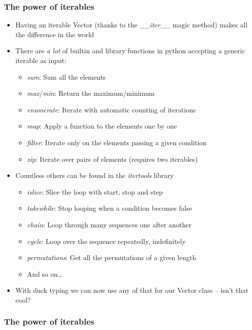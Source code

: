 \documentclass[9pt]{beamer}
\begin{document}
\begin{frame}
  \frametitle{The power of iterables}
  \begin{itemize}
    \item Having an iterable Vector (thanks to the \emph{\_\_iter\_\_} magic
          method) makes all the difference in the world
    \smallskip
    \item There are \emph{a lot} of builtin and library functions in python accepting a
          generic iterable as input:
    \begin{itemize}
      \item \emph{sum}: Sum all the elements
      \item \emph{max}/\emph{min}: Return the maximum/minimum
      \item \emph{enumerate}: Iterate with automatic counting of iterations
      \item \emph{map}: Apply a function to the elements one by one
      \item \emph{filter}: Iterate only on the elements passing a given condition
      \item \emph{zip}: Iterate over pairs of elements (requires two iterables)
    \end{itemize}
    \smallskip
    \item Countless others can be found in the \alert{\emph{itertools}} library
    \begin{itemize}
      \item \emph{islice}: Slice the loop with start, stop and step
      \item \emph{takewhile}: Stop looping when a condition becomes false
      \item \emph{chain}: Loop through many sequences one after another
      \item \emph{cycle}: Loop over the sequence repeatedly, indefinitely
      \item \emph{permutations}: Get all the permutations of a given length
      \item And so on\dots
    \end{itemize}
    \smallskip
    \item With duck typing we can now use any of that for our Vector class -- isn't that cool?
  \end{itemize}
\end{frame}
 
 
\begin{frame}
  \frametitle{The power of iterables}
  
\end{frame}
\end{document}
